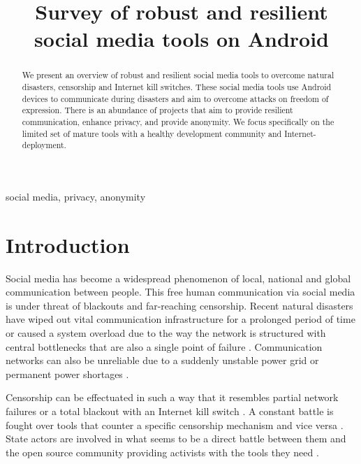 \documentclass[conference,compsoc]{IEEEtran}
\begin{document}
\title{Survey of robust and resilient social media tools on Android}

\author{
  \and
}

\maketitle

\begin{abstract}
We present an overview of robust and resilient social media tools to overcome natural disasters, censorship and Internet kill switches.
These social media tools use Android devices to communicate during disasters and aim to overcome attacks on freedom of expression.
There is an abundance of projects that aim to provide resilient communication, enhance privacy, and provide anonymity.
We focus specifically on the limited set of mature tools with a healthy development community and Internet-deployment.
\end{abstract}

\begin{IEEEkeywords}
social media, privacy, anonymity
\end{IEEEkeywords}


\section{Introduction}

Social media has become a widespread phenomenon of local, national and global communication between people.
This free human communication via social media is under threat of blackouts and far-reaching censorship.
Recent natural disasters have wiped out vital communication infrastructure for a prolonged period of time \cite{renesys2005katrina} or caused a system overload due to the way the network is structured with central bottlenecks that are also a single point of failure \cite{denis2010haiti}.
Communication networks can also be unreliable due to a suddenly unstable power grid \cite{cnn2003poweroutage} or permanent power shortages \cite{nyt2015afrika}.

Censorship can be effectuated in such a way that it resembles partial network failures \cite{hrw2006china} or a total blackout \cite{watts2014havana} with an Internet kill switch \cite{passary2015socialmedia}.
A constant battle is fought over tools that counter a specific censorship mechanism and vice versa \cite{halderman2013iran}.
State actors are involved in what seems to be a direct battle between them and the open source community providing activists with the tools they need \cite{nesterov2015tor}.
\end{document}
